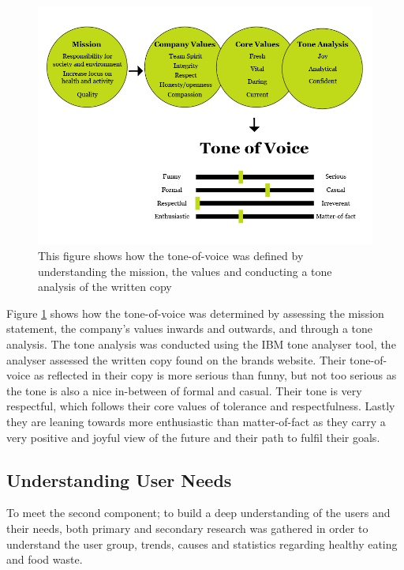     \begin{figure}
    \centering
    \includegraphics[width=\textwidth]{figures/Tone-of-voice.png}
    \caption{This figure shows how the tone-of-voice was defined by understanding the mission, the values and conducting a tone analysis of the written copy}
    \label{fig:tov}
    \end{figure}
    
    Figure \ref{fig:tov} shows how the tone-of-voice was determined by assessing the mission statement, the company's values inwards and outwards, and through a tone analysis. The tone analysis was conducted using the IBM tone analyser tool, the analyser assessed the written copy found on the brands website. Their tone-of-voice as reflected in their copy is more serious than funny, but not too serious as the tone is also a nice in-between of formal and casual. Their tone is very respectful, which follows their core values of tolerance and respectfulness. Lastly they are leaning towards more enthusiastic than matter-of-fact as they carry a very positive and joyful view of the future and their path to fulfil their goals.

\vspace{5mm}

\subsection{Understanding User Needs}
    
To meet the second component; to build a deep understanding of the users and their needs,  both primary and secondary research was gathered in order to understand the user group, trends, causes and statistics regarding healthy eating and food waste. 
  
